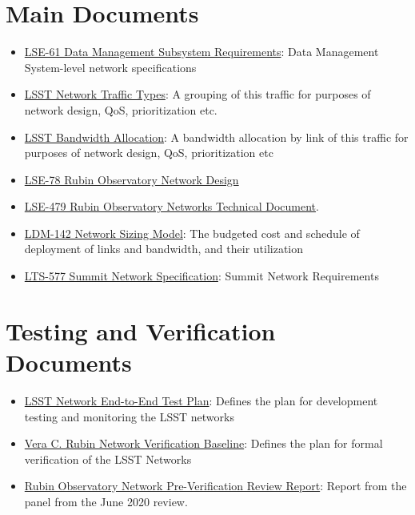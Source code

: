 
\section{Main Documents}

\begin{itemize}
    \item \href{https://confluence.lsstcorp.org/download/attachments/20284335/LSE-61.pdf?version=1&modificationDate=1490879770000&api=v2}{LSE-61 Data Management Subsystem Requirements}: Data Management System-level network specifications 
    \item \href{https://confluence.lsstcorp.org/display/DM/LSST+Network+Traffic+Types}{LSST Network Traffic Types}: A grouping of this traffic for purposes of network design, QoS, prioritization etc.
    \item \href{https://confluence.lsstcorp.org/display/DM/LSST+Network+Bandwidth+Allocation}{LSST Bandwidth Allocation}: A bandwidth allocation by link of this traffic for purposes of network design, QoS, prioritization etc
    \item  \href{https://ls.st/lse-78}{LSE-78 Rubin Observatory Network Design}
    \item \href{https://ls.st/lse-479}{LSE-479 Rubin Observatory Networks Technical Document}.
    \item  \href{https://confluence.lsstcorp.org/download/attachments/20284335/20170130%20LDM-142%20LSST%20Networks%20BL%20and%20Plan.xls?version=1&modificationDate=1491479508000&api=v2}{LDM-142 Network Sizing Model}: The budgeted cost and schedule of deployment of links and bandwidth, and their utilization
    \item \href{https://ls.st/lts-577}{LTS-577 Summit Network Specification}: Summit Network Requirements
\end{itemize}

\section{Testing and Verification Documents}

\begin{itemize}
    \item \href{https://confluence.lsstcorp.org/download/attachments/20284335/LSST%20LHN%20End-to-End_Plan_v6.docx?version=1&modificationDate=1490879785000&api=v2}{LSST Network End-to-End Test Plan}: Defines the plan for development 
    testing and monitoring the LSST networks
    \item \href{https://docushare.lsstcorp.org/docushare/dsweb/Get/LDM-732/NoContent8135677362395171770.txt}{Vera C. Rubin Network Verification Baseline}: Defines the plan for formal verification of the LSST Networks
    \item \href{https://docushare.lsstcorp.org/docushare/dsweb/Get/Document-35934/Rubin%20Observatory%20Networks%20Pre-Verification%20Review%20Report%202020-06-22.pdf}{Rubin Observatory Network Pre-Verification Review Report}: Report from the panel from the June 2020 review.
\end{itemize}


